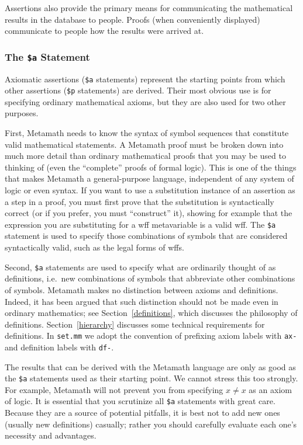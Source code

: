 Assertions also provide the primary means for communicating the mathematical
results in the database to people.  Proofs (when conveniently displayed)
communicate to people how the results were arrived at.

\subsubsection{The \texttt{\$a} Statement}

Axiomatic assertions (\texttt{\$a} statements) represent the starting points from
which other assertions (\texttt{\$p} statements) are
derived.  Their most obvious use is for specifying ordinary mathematical
axioms, but they are also used for two other purposes.

First, Metamath needs to know the syntax of symbol
sequences that constitute valid mathematical statements.  A Metamath
proof must be broken down into much more detail than ordinary
mathematical proofs that you may be used to thinking of (even the
``complete'' proofs of formal logic).  This is one
of the things that makes Metamath a general-purpose language,
independent of any system of logic or even syntax.  If you want to use a
substitution instance of an assertion as a step in a proof, you must
first prove that the substitution is syntactically correct (or if you
prefer, you must ``construct'' it), showing for example that the
expression you are substituting for a wff metavariable is a valid wff.
The \texttt{\$a} statement is used to
specify those combinations of symbols that are considered syntactically
valid, such as the legal forms of wffs.

Second, \texttt{\$a} statements are used to specify what are ordinarily thought of
as definitions, i.e.\ new combinations of symbols that abbreviate other
combinations of symbols.  Metamath makes no distinction between axioms and definitions.
Indeed, it has been argued that such distinction should not be made even in
ordinary mathematics; see Section~\ref{definitions}, which discusses the
philosophy of definitions.  Section~\ref{hierarchy} discusses some
technical requirements for definitions.  In \texttt{set.mm} we adopt the
convention of prefixing axiom labels with \texttt{ax-} and definition labels with
\texttt{df-}\index{label}.

The results that can be derived with the Metamath language are only as good as
the \texttt{\$a}\index{\texttt{\$a} statement} statements used as their starting
point.  We cannot stress this too strongly.  For example, Metamath will
not prevent you from specifying $x\neq x$ as an axiom of logic.  It is
essential that you scrutinize all \texttt{\$a} statements with great care.
Because they are a source of potential pitfalls, it is best not to add new
ones (usually new definitions) casually; rather you should carefully evaluate
each one's necessity and advantages.

